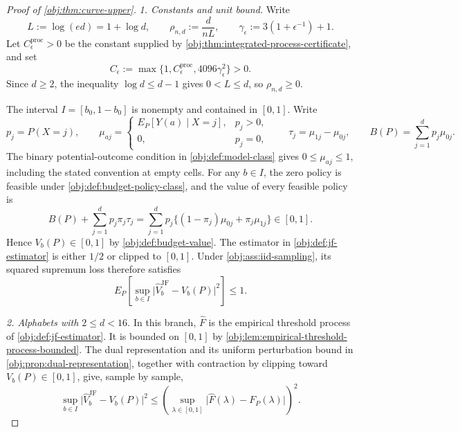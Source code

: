 \begin{proof}[Proof of \cref{obj:thm:curve-upper}]
\textit{1. Constants and unit bound.} Write
\[
L:=\log(ed)=1+\log d,\qquad
\rho_{n,d}:=\frac{d}{nL},\qquad
\gamma_\epsilon:=3(1+\epsilon^{-1})+1.
\]
Let \(C_\epsilon^{\mathrm{proc}}>0\) be the constant supplied by \cref{obj:thm:integrated-process-certificate}, and set
\[
C_\epsilon:=\max\{1,C_\epsilon^{\mathrm{proc}},4096\gamma_\epsilon^2\}>0.
\]
Since \(d\ge2\), the inequality \(\log d\le d-1\) gives \(0<L\le d\), so \(\rho_{n,d}\ge0\).

The interval \(I=[b_0,1-b_0]\) is nonempty and contained in \([0,1]\). Write
\[
p_j=P(X=j),\qquad
\mu_{aj}=\begin{cases}E_P[Y(a)\mid X=j],&p_j>0,\\0,&p_j=0,\end{cases}
\qquad
\tau_j=\mu_{1j}-\mu_{0j},\qquad
B(P)=\sum_{j=1}^d p_j\mu_{0j}.
\]
The binary potential-outcome condition in \cref{obj:def:model-class} gives \(0\le\mu_{aj}\le1\), including the stated convention at empty cells. For any \(b\in I\), the zero policy is feasible under \cref{obj:def:budget-policy-class}, and the value of every feasible policy is
\[
B(P)+\sum_{j=1}^d p_j\pi_j\tau_j
=\sum_{j=1}^d p_j\bigl\{(1-\pi_j)\mu_{0j}+\pi_j\mu_{1j}\bigr\}\in[0,1].
\]
Hence \(V_b(P)\in[0,1]\) by \cref{obj:def:budget-value}. The estimator in \cref{obj:def:jf-estimator} is either \(1/2\) or clipped to \([0,1]\). Under \cref{obj:ass:iid-sampling}, its squared supremum loss therefore satisfies
\[
E_P\!\left[\sup_{b\in I}
 \bigl|\widehat V_b^{\mathrm{JF}}-V_b(P)\bigr|^2\right]\le1.
\]

\textit{2. Alphabets with \(2\le d<16\).} In this branch, \(\widehat F\) is the empirical threshold process of \cref{obj:def:jf-estimator}. It is bounded on \([0,1]\) by \cref{obj:lem:empirical-threshold-process-bounded}. The dual representation and its uniform perturbation bound in \cref{obj:prop:dual-representation}, together with contraction by clipping toward \(V_b(P)\in[0,1]\), give, sample by sample,
\[
\sup_{b\in I}
 \bigl|\widehat V_b^{\mathrm{JF}}-V_b(P)\bigr|^2
\le
\left(\sup_{\lambda\in[0,1]}
 \bigl|\widehat F(\lambda)-F_P(\lambda)\bigr|\right)^2.
\]


\end{proof}
